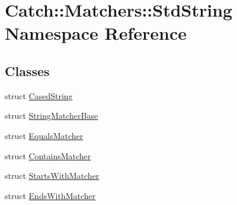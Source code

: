 \hypertarget{namespace_catch_1_1_matchers_1_1_std_string}{\section{Catch\-:\-:Matchers\-:\-:Std\-String Namespace Reference}
\label{namespace_catch_1_1_matchers_1_1_std_string}
}
\subsection*{Classes}
\begin{DoxyCompactItemize}
\item 
struct \hyperlink{struct_catch_1_1_matchers_1_1_std_string_1_1_cased_string}{Cased\-String}
\item 
struct \hyperlink{struct_catch_1_1_matchers_1_1_std_string_1_1_string_matcher_base}{String\-Matcher\-Base}
\item 
struct \hyperlink{struct_catch_1_1_matchers_1_1_std_string_1_1_equals_matcher}{Equals\-Matcher}
\item 
struct \hyperlink{struct_catch_1_1_matchers_1_1_std_string_1_1_contains_matcher}{Contains\-Matcher}
\item 
struct \hyperlink{struct_catch_1_1_matchers_1_1_std_string_1_1_starts_with_matcher}{Starts\-With\-Matcher}
\item 
struct \hyperlink{struct_catch_1_1_matchers_1_1_std_string_1_1_ends_with_matcher}{Ends\-With\-Matcher}
\end{DoxyCompactItemize}
